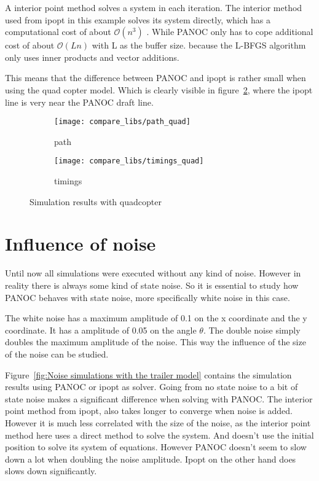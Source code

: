 A interior point method solves a system in each iteration. The interior method used from ipopt in this example solves its system directly, which has a computational cost of about $\mathcal{O}(n^3)$ . While PANOC only has to cope additional cost of about $\mathcal{O}(Ln)$ with L as the buffer size.  because the L-BFGS algorithm only uses inner products and vector additions.

This means that the difference between PANOC and ipopt is rather small when using the quad copter model. Which is clearly visible in figure~\ref{fig:timings trailer quad}, where the ipopt line is very near the PANOC draft line.
\begin{figure}[H]
	\centering
	\begin{subfigure}[b]{0.45\textwidth}
		\centering
		\texttt{[image: compare\_libs/path\_quad]}
		\caption{path}
		\label{fig:solution path trailer quad}
	\end{subfigure}
	\hfill
	\begin{subfigure}[b]{0.45\textwidth}
		\centering
		\texttt{[image: compare\_libs/timings\_quad]}
		\caption{timings}
		\label{fig:timings trailer quad}
	\end{subfigure}
	\caption{Simulation results with quadcopter}
	\label{fig:Simulation results with quadcopter}
\end{figure}

\section{Influence of noise}
Until now all simulations were executed without any kind of noise. However in reality there is always some kind of state noise. So it is essential to study how PANOC behaves with state noise, more specifically white noise in this case.

The white noise has a maximum amplitude of 0.1 on the x coordinate and the y coordinate. It has a amplitude of 0.05 on the angle $\theta$. The double noise simply doubles the maximum amplitude of the noise. This way the influence of the size of the noise can be studied.

Figure~\ref{fig:Noise simulations with the trailer model} contains the simulation results using PANOC or ipopt as solver. Going from no state noise to a bit of state noise makes a significant difference when solving with PANOC. The interior point method from ipopt, also takes longer to converge when noise is added. However it is much less correlated with the size of the noise, as the interior point method here uses a direct method to solve the system. And doesn't use the initial position to solve its system of equations. However PANOC doesn't seem to slow down a lot when doubling the noise amplitude. Ipopt on the other hand does slows down significantly.

